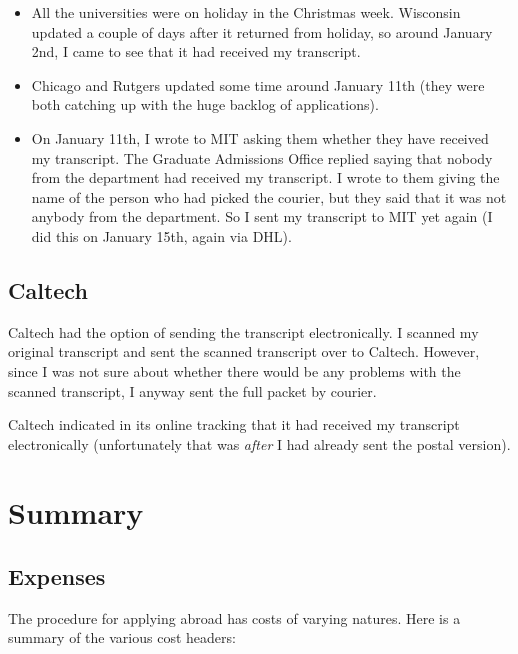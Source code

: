 \documentclass[a4paper]{amsart}
\begin{document}
\begin{itemize}

\item All the universities were on holiday in the Christmas week. Wisconsin
  updated a couple of days after it returned from holiday, so around
  January 2nd, I came to see that it had received my transcript.

\item Chicago and Rutgers updated some time around January 11th (they were
  both catching up with the huge backlog of applications).

\item On January 11th, I wrote to MIT asking them whether they have received
  my transcript. The Graduate Admissions Office replied saying that nobody
  from the department had received my transcript. I wrote to them
  giving the name of the person who had picked the courier, but they said that
  it was not anybody from the department. So I sent my transcript
  to MIT yet again (I did this on January 15th, again via DHL).

\end{itemize}

\subsection{Caltech}

Caltech had the option of sending the transcript electronically. I scanned
my original transcript and sent the scanned transcript over to Caltech.
However, since I was not sure about whether there would be any problems with
the scanned transcript, I anyway sent the full packet by courier.

Caltech indicated in its online tracking that it had received my
transcript electronically (unfortunately that was {\em after} I had already
sent the postal version).

\section{Summary}

\subsection{Expenses}

The procedure for applying abroad has costs of varying natures. Here
is a summary of the various cost headers:
\end{document}
